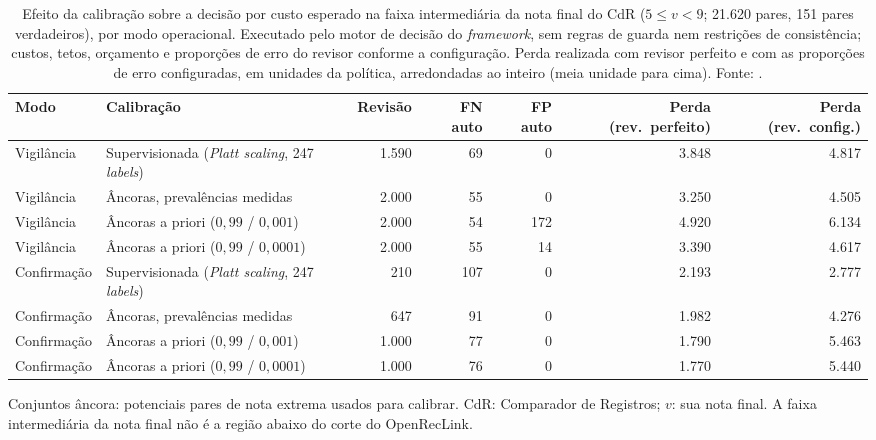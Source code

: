 \begin{table}[!ht]
\centering
\caption{Efeito da calibração sobre a decisão por custo esperado na faixa intermediária da nota final do CdR ($5\leq v<9$; 21.620 pares, 151 pares verdadeiros), por modo operacional. Executado pelo motor de decisão do \textit{framework}, sem regras de guarda nem restrições de consistência; custos, tetos, orçamento e proporções de erro do revisor conforme a configuração. Perda realizada com revisor perfeito e com as proporções de erro configuradas, em unidades da política, arredondadas ao inteiro (meia unidade para cima). Fonte: \protect{}.}
\label{tab:cap8-ancoras-decisao}
\scriptsize
\setlength{\tabcolsep}{3pt}
\begin{tabular}{|l|l|r|r|r|r|r|}
\hline
Modo & Calibração & Revisão & FN auto & FP auto & Perda (rev.\ perfeito) & Perda (rev.\ config.) \\
\hline
Vigilância & Supervisionada (\textit{Platt scaling}, 247 \textit{labels}) & 1.590 & 69 & 0 & 3.848 & 4.817 \\
Vigilância & Âncoras, prevalências medidas & 2.000 & 55 & 0 & 3.250 & 4.505 \\
Vigilância & Âncoras a priori ($0{,}99$ / $0{,}001$) & 2.000 & 54 & 172 & 4.920 & 6.134 \\
Vigilância & Âncoras a priori ($0{,}99$ / $0{,}0001$) & 2.000 & 55 & 14 & 3.390 & 4.617 \\
\hline
Confirmação & Supervisionada (\textit{Platt scaling}, 247 \textit{labels}) & 210 & 107 & 0 & 2.193 & 2.777 \\
Confirmação & Âncoras, prevalências medidas & 647 & 91 & 0 & 1.982 & 4.276 \\
Confirmação & Âncoras a priori ($0{,}99$ / $0{,}001$) & 1.000 & 77 & 0 & 1.790 & 5.463 \\
Confirmação & Âncoras a priori ($0{,}99$ / $0{,}0001$) & 1.000 & 76 & 0 & 1.770 & 5.440 \\
\hline
\end{tabular}
\par\footnotesize Conjuntos âncora: potenciais pares de nota extrema usados para calibrar. CdR: Comparador de Registros; $v$: sua nota final. A faixa intermediária da nota final não é a região abaixo do corte do OpenRecLink.
\end{table}
